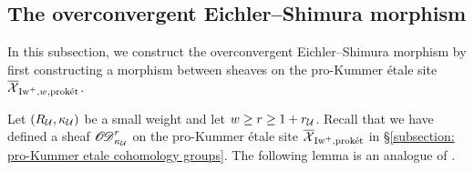 \subsection{The overconvergent Eichler--Shimura morphism}\label{subsection: OES}
In this subsection, we construct the overconvergent Eichler--Shimura morphism by first constructing a morphism between sheaves on the pro-Kummer \'{e}tale site $\overline{\operatorname{\mathcal{X}}}_{\operatorname{Iw}^+, w, \operatorname{\textrm{prok\'{e}t}}}$.

Let $(R_{\operatorname{\mathcal{U}}}, \kappa_{\operatorname{\mathcal{U}}})$ be a small weight and let $w \geq r\geq 1+r_{\operatorname{\mathcal{U}}}$. Recall that we have defined a sheaf $\operatorname{\operatorname{\mathscr{O}}\!\!\operatorname{\mathscr{D}}}_{\kappa_{\operatorname{\mathcal{U}}}}^{r}$ on the pro-Kummer \'{e}tale site $\overline{\operatorname{\mathcal{X}}}_{\operatorname{Iw}^+, \operatorname{\textrm{prok\'{e}t}}}$ in \S \ref{subsection: pro-Kummer etale cohomology groups}. The following lemma is an analogue of \cite[Lemma 4.5]{CHJ-2017}.

